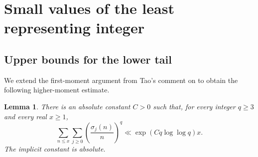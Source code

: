 \documentclass[11pt,letterpaper,reqno]{amsart}
\numberwithin{equation}{section}
\newtheorem{lemma}[theorem]{Lemma}
\theoremstyle{remark}
\newcommand{\1}{\mathbf 1}
\renewcommand{\leq}{\leqslant}
\renewcommand{\geq}{\geqslant}
\begin{document}
\section{Small values of the least representing integer}

\subsection{Upper bounds for the lower tail}

We extend the first-moment argument from Tao's comment on \cite{Bloom1054} to obtain the following higher-moment estimate.

\begin{lemma}\label{lem:kovac-moment}
There is an absolute constant $C>0$ such that, for every integer $q\geq3$
and every real $x\geq1$,
\[
 \sum_{n\leq x}\sum_{j\geq0}
 \left(\frac{\sigma_j(n)}n\right)^q
 \ll \exp(Cq\log\log q)x.
\]
The implicit constant is absolute.
\end{lemma}
\end{document}
